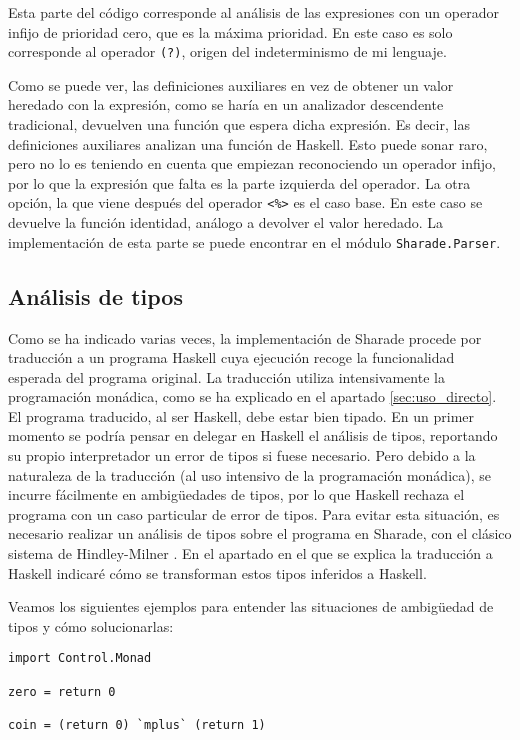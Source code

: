\documentclass[class=article, crop=false]{standalone}
\begin{document}
Esta parte del código corresponde al análisis de las expresiones con un operador infijo de
prioridad cero, que es la máxima prioridad. En este caso es solo corresponde al operador
\verb`(?)`, origen del indeterminismo de mi lenguaje.

Como se puede ver, las definiciones auxiliares en vez de obtener un valor heredado con la
expresión, como se haría en un analizador descendente tradicional, devuelven una función que
espera dicha expresión. Es decir, las definiciones auxiliares analizan una función de
Haskell. Esto puede sonar raro, pero no lo es teniendo en cuenta que empiezan reconociendo un
operador infijo, por lo que la expresión que falta es la parte izquierda del operador. La
otra opción, la que viene después del operador \verb`<%>` es el caso base. En este caso se
devuelve la función identidad, análogo a devolver el valor heredado. La implementación de
esta parte se puede encontrar en el módulo \verb`Sharade.Parser`.

\subsection{Análisis de tipos}

Como se ha indicado varias veces, la implementación de Sharade procede por traducción a un
programa Haskell cuya ejecución recoge la funcionalidad esperada del programa original. La
traducción utiliza intensivamente la programación monádica, como se ha explicado en el
apartado \ref{sec:uso_directo}. El programa traducido, al ser Haskell, debe estar bien
tipado. En un primer momento se podría pensar en delegar en Haskell el análisis de tipos,
reportando su propio interpretador un error de tipos si fuese necesario. Pero debido a la
naturaleza de la traducción (al uso intensivo de la programación monádica), se incurre
fácilmente en ambigüedades de tipos, por lo que Haskell rechaza el programa con un caso
particular de error de tipos. Para evitar esta situación, es necesario realizar un análisis
de tipos sobre el programa en Sharade, con el clásico sistema de
Hindley-Milner \cite{hindley1969principal}. En el apartado en el que se explica la traducción
a Haskell indicaré cómo se transforman estos tipos inferidos a Haskell.

Veamos los siguientes ejemplos para entender las situaciones de ambigüedad de tipos y cómo
solucionarlas:

\begin{verbatim}
import Control.Monad

zero = return 0

coin = (return 0) `mplus` (return 1)
\end{verbatim}
\end{document}

